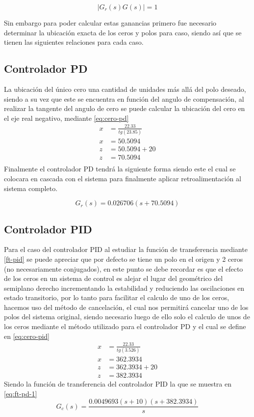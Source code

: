\documentclass[conference]{IEEEtran}
\begin{document}
	\begin{equation}
		|G_r(s)G(s)| = 1
		\label{eq:condicion-magnitud}
	\end{equation}
	
	Sin embargo para poder calcular estas ganancias primero fue necesario determinar la ubicación exacta de los ceros y polos para caso, siendo así que se tienen las siguientes relaciones para cada caso.
	
	\subsection{Controlador PD}
	
	La ubicación del único cero una cantidad de unidades más allá del polo deseado, siendo a su vez que este se encuentra en función del angulo de compensación, al realizar la tangente del angulo de cero se puede calcular la ubicación del cero en el eje real negativo, mediante \ref{eq:cero-pd}
	\begin{align}
		x &= \frac{22.33}{tg(23.85)} \\ 
		x &= 50.5094 \\
		z &= 50.5094 + 20 \\
		z &= 70.5094 \\
		\label{eq:cero-pd}
	\end{align}
	Finalmente el controlador PD tendrá la siguiente forma siendo este el cual se colocara en cascada con el sistema para finalmente aplicar retroalimentación al sistema completo.
	
	\begin{equation}
		G_r(s) = 0.026706(s + 70.5094)
		\label{eq:ft-pd-1}
	\end{equation}
	\subsection{Controlador PID}
	Para el caso del controlador PID al estudiar la función de transferencia mediante \ref{ft-pid} se puede apreciar que por defecto se tiene un polo en el origen y 2 ceros (no necesariamente conjugados), en este punto se debe recordar es que el efecto de los ceros en un sistema de control es alejar el lugar del geométrico del semiplano derecho incrementando la estabilidad y reduciendo las oscilaciones en estado transitorio, por lo tanto para facilitar el calculo de uno de los ceros, hacemos uso del método de cancelación, el cual nos permitirá cancelar uno de los polos del sistema original, siendo necesario luego de ello solo el calculo de unos de los ceros mediante el método utilizado para el controlador PD y el cual se define en \ref{eq:cero-pid}
	\begin{align}
		x &= \frac{22.33}{tg(3.526)}\\
		x &= 362.3934 \\
		z &= 362.3934 + 20 \\
		z &= 382.3934
		\label{eq:cero-pid}
	\end{align}
	Siendo la función de transferencia del controlador PID la que se muestra en \ref{eq:ft-pd-1}
	\begin{equation}
		G_c(s) = \frac{0.0049693(s + 10)(s + 382.3934)}{s}
		\label{eq:ft-pid-1}
	\end{equation}
	
\end{document}
